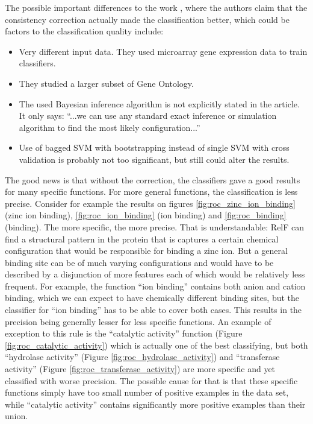 \documentclass[11pt,twoside,a4paper]{book}
\begin{document}
The possible important differences to the work \cite{bnet},
where the authors claim that the consistency correction actually made the classification better,
which could be factors to the classification quality include:
\begin{itemize}
 \item Very different input data. They used microarray gene expression data to train classifiers.
 \item They studied a larger subset of Gene Ontology.
 \item The used Bayesian inference algorithm is not explicitly stated in the article. It only says: ``...we can use any standard exact inference or simulation algorithm to find the most likely configuration...''
 \item Use of bagged SVM with bootstrapping instead of single SVM with cross validation is probably not too significant, but still could alter the results.
\end{itemize}


The good news is that without the correction, the classifiers gave a good results
for many specific functions. 
For more general functions, the classification is less precise.
Consider for example the results on figures \ref{fig:roc_zinc_ion_binding} (zinc ion binding),
\ref{fig:roc_ion_binding} (ion binding) and \ref{fig:roc_binding} (binding).
The more specific, the more precise.
That is understandable:
RelF can find a structural pattern in the protein that is captures a certain chemical configuration
that would be responsible for binding a zinc ion.
But a general binding site can be of much varying configurations and would have to be described 
by a disjunction of more features each of which would be relatively less frequent.
For example, the function ``ion binding'' contains both anion and cation binding,
which we can expect to have chemically different binding sites,
but the classifier for ``ion binding'' has to be able to cover both cases.
This results in the precision being generally lesser for less specific functions.
An example of exception to this rule is the ``catalytic activity'' function (Figure \ref{fig:roc_catalytic_activity})
which is actually one of the best classifying,
but both ``hydrolase activity'' (Figure \ref{fig:roc_hydrolase_activity}) and ``transferase activity''
(Figure \ref{fig:roc_transferase_activity}) 
are more specific and yet classified with worse precision.
The possible cause for that is that these specific functions simply have too small number of positive examples in the data set,
while ``catalytic activity'' contains significantly more positive examples than their union.
\end{document}
